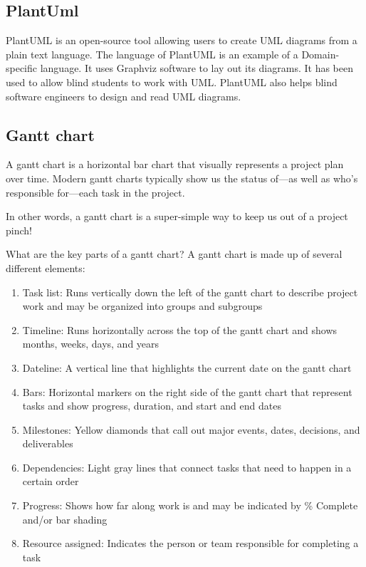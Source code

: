 \subsection{PlantUml}
PlantUML is an open-source tool allowing users to create UML diagrams from a plain text language. The language of PlantUML is an example of a Domain-specific language. It uses Graphviz software to lay out its diagrams. It has been used to allow blind students to work with UML. PlantUML also helps blind software engineers to design and read UML diagrams.


\subsection{Gantt chart}
A gantt chart is a horizontal bar chart that visually represents a project plan over time. Modern gantt charts typically show us the status of—as well as who’s responsible for—each task in the project.

In other words, a gantt chart is a super-simple way to keep us out of a project pinch!

What are the key parts of a gantt chart?
A gantt chart is made up of several different elements:
\begin{enumerate}
    \item
          Task list: Runs vertically down the left of the gantt chart to describe project work and may be organized into groups and subgroups
    \item
          Timeline: Runs horizontally across the top of the gantt chart and shows months, weeks, days, and years
    \item
          Dateline: A vertical line that highlights the current date on the gantt chart
    \item
          Bars: Horizontal markers on the right side of the gantt chart that represent tasks and show progress, duration, and start and end dates
    \item
          Milestones: Yellow diamonds that call out major events, dates, decisions, and deliverables
    \item
          Dependencies: Light gray lines that connect tasks that need to happen in a certain order
    \item
          Progress: Shows how far along work is and may be indicated by \% Complete and/or bar shading
    \item
          Resource assigned: Indicates the person or team responsible for completing a task
\end{enumerate}


